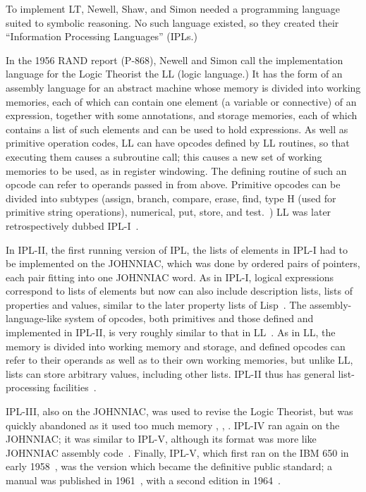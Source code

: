 \documentclass[journal]{IEEEtran}
\begin{document}
To implement LT, Newell, Shaw, and Simon needed a programming language
suited to symbolic reasoning. No such language existed, so they
created their ``Information Processing Languages'' (IPLs.)

In the 1956 RAND report (P-868), Newell and Simon call the implementation
language for the Logic Theorist the LL (logic language.) It has the
form of an assembly language for an abstract machine whose memory
is divided into working memories, each of which can contain one
element (a variable or connective) of an expression, together with
some annotations, and storage memories, each of which contains a
list of such elements and can be used to hold expressions.  As well
as primitive operation codes, LL can have opcodes defined by LL
routines, so that executing them causes a subroutine call; this
causes a new set of working memories to be used, as in register
windowing.  The defining routine of such an opcode can refer to
operands passed in from above.  Primitive opcodes can be divided
into subtypes (assign, branch, compare, erase, find, type H (used
for primitive string operations), numerical, put, store, and
test.~\cite{LT1956b}) LL was later retrospectively dubbed
IPL-I~\cite[p.~166]{mccorduck2004machines}.

In IPL-II, the first running version of IPL, the lists of elements
in IPL-I had to be implemented on the JOHNNIAC, which was done by ordered pairs
of pointers, each pair fitting into one JOHNNIAC word.
As in IPL-I, logical expressions correspond to
lists of elements but now can also include description lists,
lists of properties and values, similar to the later property
lists of Lisp~\cite{newellshaw1957}.  The assembly-language-like system of opcodes,
both primitives and those defined and implemented in IPL-II,
is very roughly similar to that in LL~\cite{notes1957}.
As in LL, the memory is
divided into working memory and storage, and defined opcodes
can refer to their operands as well as to their own working
memories, but unlike LL, lists can store arbitrary values,
including other lists.  IPL-II thus has general list-processing
facilities~\cite{newellshaw1957}.

IPL-III, also on the JOHNNIAC, was used to
revise the Logic Theorist, but was quickly abandoned
as it used too much memory
\cite[p.~xxi]{newell1964ipl}, \cite[p.~II-18]{cip16june1958},
\cite{cip61957}.
IPL-IV ran again on the JOHNNIAC; it was similar to IPL-V,
although its format was more like JOHNNIAC assembly code~\cite{cip16june1958}.
Finally, IPL-V, which first ran on the IBM 650 in early 1958~\cite{DOC1963,iplv1986},
was the version which became the definitive public standard; a manual
was published in 1961~\cite{newell1961ipl}, with a second edition in
1964~\cite{newell1964ipl}.
\end{document}

